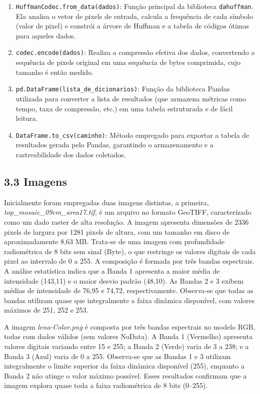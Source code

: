 \documentclass{report}
\begin{document}
\begin{enumerate}
    \item \texttt{HuffmanCodec.from\_data(dados)}: Função principal da biblioteca \texttt{dahuffman}. Ela analisa o vetor de pixels de entrada, calcula a frequência de cada símbolo (valor de pixel) e constrói a árvore de Huffman e a tabela de códigos ótimas para aqueles dados.
    
    \item \texttt{codec.encode(dados)}: Realiza a compressão efetiva dos dados, convertendo a sequência de pixels original em uma sequência de bytes comprimida, cujo tamanho é então medido.
    
    \item \texttt{pd.DataFrame(lista\_de\_dicionarios)}: Função da biblioteca Pandas utilizada para converter a lista de resultados (que armazena métricas como tempo, taxa de compressão, etc.) em uma tabela estruturada e de fácil leitura.
    
    \item \texttt{DataFrame.to\_csv(caminho)}: Método empregado para exportar a tabela de resultados gerada pelo Pandas, garantindo o armazenamento e a rastreabilidade dos dados coletados.
\end{enumerate}

\subsection*{3.3 Imagens}

Inicialmente foram empregadas duas imagens distintas, a primeira, \textit{top\_mosaic\_09cm\_area17.tif}, é um arquivo no formato GeoTIFF, caracterizado como um dado raster de alta resolução. A imagem apresenta dimensões de 2336 pixels de largura por 1281 pixels de altura, com um tamanho em disco de aproximadamente 8,63 MB. Trata-se de uma imagem com profundidade radiométrica de 8 bits sem sinal (Byte), o que restringe os valores digitais de cada pixel ao intervalo de 0 a 255. A composição é formada por três bandas espectrais. A análise estatística indica que a Banda 1 apresenta a maior média de intensidade (143,11) e o maior desvio padrão (48,10). As Bandas 2 e 3 exibem médias de intensidade de 76,95 e 74,72, respectivamente. Observa-se que todas as bandas utilizam quase que integralmente a faixa dinâmica disponível, com valores máximos de 251, 252 e 253.

A imagem \textit{lena-Color.png} é composta por três bandas espectrais no modelo RGB, todas com dados válidos (sem valores NoData). A Banda 1 (Vermelho) apresenta valores digitais variando entre 15 e 255; a Banda 2 (Verde) varia de 3 a 238; e a Banda 3 (Azul) varia de 0 a 255. Observa-se que as Bandas 1 e 3 utilizam integralmente o limite superior da faixa dinâmica disponível (255), enquanto a Banda 2 não atinge o valor máximo possível. Esses resultados confirmam que a imagem explora quase toda a faixa radiométrica de 8 bits (0–255). 
\end{document}
